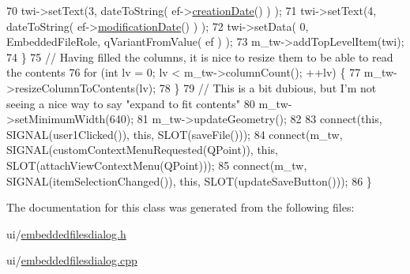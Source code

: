 \begin{DoxyCode}
70         twi->setText(3, dateToString( ef->\hyperlink{classOkular_1_1EmbeddedFile_a38d16f20c546229d65f2afac1e6f162b}{creationDate}() ) );
71         twi->setText(4, dateToString( ef->\hyperlink{classOkular_1_1EmbeddedFile_a4f8bf566b56f606a2c1756b04930e5f0}{modificationDate}() ) );
72         twi->setData( 0, EmbeddedFileRole, qVariantFromValue( ef ) );
73         m\_tw->addTopLevelItem(twi);
74     \}
75         \textcolor{comment}{// Having filled the columns, it is nice to resize them to be able to read the contents}
76         \textcolor{keywordflow}{for} (\textcolor{keywordtype}{int} lv = 0; lv <  m\_tw->columnCount(); ++lv) \{
77                 m\_tw->resizeColumnToContents(lv);
78         \}
79         \textcolor{comment}{// This is a bit dubious, but I'm not seeing a nice way to say "expand to fit contents"}
80         m\_tw->setMinimumWidth(640);
81         m\_tw->updateGeometry();
82 
83     connect(\textcolor{keyword}{this}, SIGNAL(user1Clicked()), \textcolor{keyword}{this}, SLOT(saveFile()));
84     connect(m\_tw, SIGNAL(customContextMenuRequested(QPoint)), \textcolor{keyword}{this}, SLOT(attachViewContextMenu(QPoint)));
85     connect(m\_tw, SIGNAL(itemSelectionChanged()), \textcolor{keyword}{this}, SLOT(updateSaveButton()));
86 \}
\end{DoxyCode}


The documentation for this class was generated from the following files\+:\begin{DoxyCompactItemize}
\item 
ui/\hyperlink{embeddedfilesdialog_8h}{embeddedfilesdialog.\+h}\item 
ui/\hyperlink{embeddedfilesdialog_8cpp}{embeddedfilesdialog.\+cpp}\end{DoxyCompactItemize}
